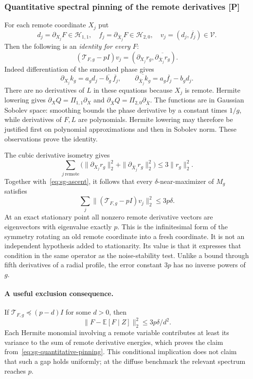 \subsubsection{Quantitative spectral pinning of the remote derivatives [P]}
For each remote coordinate $X_j$ put
\[
 d_j=\partial_{X_j}F\in\mathcal H_{1,1},\quad
 f_j=\partial_{\bar X_j}F\in\mathcal H_{2,0},\quad
 v_j=(d_j,\overline{f_j})\in\mathcal V.
\]
Then the following is an \emph{identity for every} $F$:
\begin{equation}\label{eq:sg-pinning}
 \boxed{(\mathcal T_{F,g}-pI)v_j
       =(\partial_{X_j}r_g,\overline{\partial_{\bar X_j}r_g}).}
\end{equation}
Indeed differentiation of the smoothed phase gives
\[
 \partial_{X_j}k_g=a_gd_j-\overline{b_g}\,\overline{f_j},\qquad
 \overline{\partial_{\bar X_j}k_g}
       =a_g\overline{f_j}-b_gd_j.
\]
There are no derivatives of $L$ in these equations because $X_j$ is remote.
Hermite lowering gives
$\partial_X Q=\Pi_{1,1}\partial_X$ and
$\partial_{\bar X}Q=\Pi_{2,0}\partial_{\bar X}$.
The functions are in Gaussian Sobolev space: smoothing bounds the phase
derivative by a constant times $1/g$, while derivatives of $F,L$ are
polynomials. Hermite lowering may therefore be justified first on polynomial
approximations and then in Sobolev norm. These observations prove the identity.

The cubic derivative isometry gives
\[
 \sum_{j\ \text{remote}}\bigl(\|\partial_{X_j}r_g\|_2^2+
                   \|\partial_{\bar X_j}r_g\|_2^2\bigr)
 \le3\|r_g\|_2^2.
\]
Together with~\eqref{eq:sg-ascent}, it follows that every
$\delta$-near-maximizer of $M_g$ satisfies
\begin{equation}\label{eq:sg-quantitative-pinning}
 \boxed{\sum_j\|(\mathcal T_{F,g}-pI)v_j\|_2^2\le3p\delta.}
\end{equation}
At an exact stationary point all nonzero remote derivative vectors are
eigenvectors with eigenvalue exactly $p$. This is the infinitesimal form
of the symmetry rotating an old remote coordinate into a fresh coordinate.
It is not an independent hypothesis added to stationarity. Its value is that
it expresses that condition in the same operator as the noise-stability test.
Unlike a bound through fifth derivatives of a radial profile, the error
constant $3p$ has no inverse powers of $g$.

\paragraph{A useful exclusion consequence.}
If $\mathcal T_{F,g}\preceq(p-d)I$ for some $d>0$, then
\[
 \|F-\mathbb E[F\mid Z]\|_2^2\le 3p\delta/d^2.
\]
Each Hermite monomial involving a remote variable contributes at least
its variance to the sum of remote derivative energies, which proves the
claim from~\eqref{eq:sg-quantitative-pinning}. This conditional implication
does not claim that such a gap holds uniformly; at the diffuse benchmark
the relevant spectrum reaches $p$.

